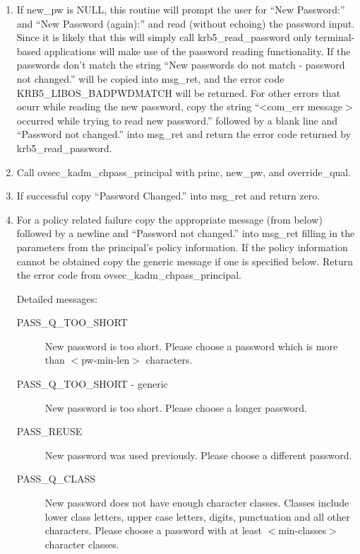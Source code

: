\begin{enumerate}
\item If new_pw is NULL, this routine will prompt the user for
``New Password:'' and ``New Password (again):'' and read (without
echoing) the password input. Since it is likely that this will simply
call krb5_read_password only terminal-based applications will make use
of the password reading functionality. If the passwords don't match
the string ``New passwords do not match - password not changed.'' will
be copied into msg_ret, and the error code KRB5_LIBOS_BADPWDMATCH will
be returned.  For other errors that ocurr while reading the new
password, copy the string ``<com_err message$>$ occurred while trying
to read new password.''  followed by a blank line and ``Password not
changed.'' into msg_ret and return the error code returned by
krb5_read_password.

\item Call ovsec_kadm_chpass_principal with princ, new_pw, and override_qual.

\item If successful copy ``Password Changed.'' into msg_ret and return zero.

\item For a policy related failure copy the appropriate message (from below) 
followed by a newline and ``Password not changed.'' into msg_ret
filling in the parameters from the principal's policy information. If
the policy information cannot be obtained copy the generic message if
one is specified below. Return the error code from
ovsec_kadm_chpass_principal.

Detailed messages:
\begin{description}

\item[PASS_Q_TOO_SHORT]
New password is too short. Please choose a
password which is more than $<$pw-min-len$>$ characters.

\item[PASS_Q_TOO_SHORT - generic]
New password is too short. Please choose a longer password.

\item[PASS_REUSE]
New password was used previously. Please choose a
different password.

\item[PASS_Q_CLASS]
New password does not have enough character classes. Classes include
lower class letters, upper case letters, digits, punctuation and all
other characters.  Please choose a password with at least
$<$min-classes$>$ character classes.


\end{description}
\end{enumerate}
